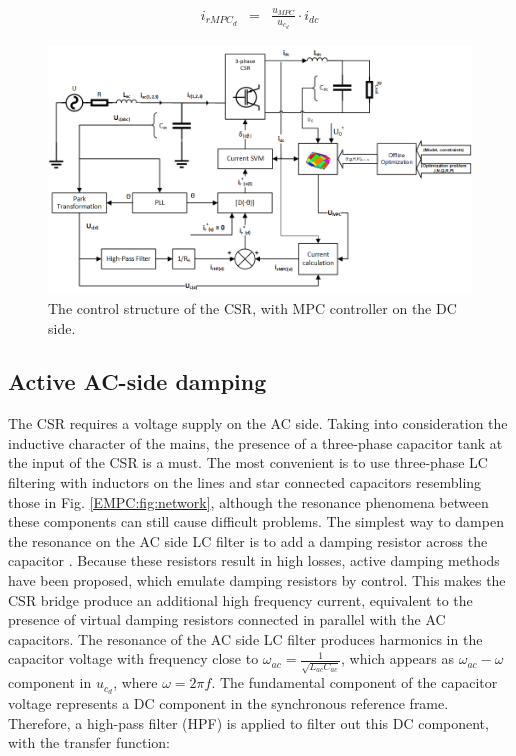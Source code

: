     \begin{equation}
        \begin{array}{rcl}
            i_{rMPC_{d}}&=&\frac{u_{MPC}}{u_{c_d}}\cdot i_{dc}
        \end{array}
        \label{EMPC:equ:direct_controlval}
    \end{equation}

    \begin{figure}[!ht]
        \centering
        \includegraphics[width=\textwidth]{EMPC_PNG_Pics/MPCStructure.png}
        \caption{The control structure of the CSR, with MPC controller on the DC side.}
        \label{EMPC:fig:MPCStructure}
    \end{figure}

\subsection{Active AC-side damping}\label{EMPC:sec:ACdamping}

    The CSR requires a voltage supply on the AC side. Taking into consideration the inductive character of the mains, the presence of a three-phase capacitor tank at the input of the CSR is a must. The most convenient is to use three-phase LC filtering with inductors on the lines and star connected capacitors resembling those in Fig. \ref{EMPC:fig:network}, although the resonance phenomena between these components can still cause difficult problems. The simplest way to dampen the resonance on the AC side LC filter is to add a damping resistor across the capacitor \cite{regaya2014new}. Because these resistors result in high losses, active damping methods have been proposed, which emulate damping resistors by control. This makes the CSR bridge produce an additional high frequency current, equivalent to the presence of virtual damping resistors connected in parallel with the AC capacitors. The resonance of the AC side LC filter produces harmonics in the capacitor voltage with frequency close to $\omega_{ac}=\frac{1}{\sqrt{L_{ac}C_{ac}}}$, which appears as $\omega_{ac}-\omega$ component in $u_{c_d}$, where $\omega=2\pi f$. The fundamental component of the capacitor voltage represents a DC component in the synchronous reference frame. Therefore, a high-pass filter (HPF) is applied to filter out this DC component, with the transfer function:

